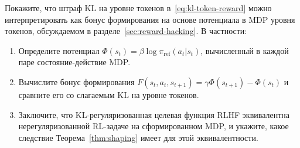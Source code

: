 \begin{exercise}
\label{ex:potential-kl}
Покажите, что штраф KL на уровне токенов в~\eqref{eq:kl-token-reward} можно интерпретировать как бонус формирования на основе потенциала в MDP уровня токенов, обсуждаемом в разделе~\ref{sec:reward-hacking}. В частности:
\begin{enumerate}
  \item Определите потенциал $\Phi(s_t) = \beta\log\pi_{\mathrm{ref}}(a_t | s_t)$, вычисленный в каждой паре состояние-действие MDP.
  \item Вычислите бонус формирования $F(s_t, a_t, s_{t+1}) = \gamma\Phi(s_{t+1}) - \Phi(s_t)$ и сравните его со слагаемым KL на уровне токенов.
  \item Заключите, что KL-регуляризованная целевая функция RLHF эквивалентна нерегуляризованной RL-задаче на сформированном MDP, и укажите, какое следствие Теорема~\ref{thm:shaping} имеет для этой эквивалентности.
\end{enumerate}
\end{exercise}
